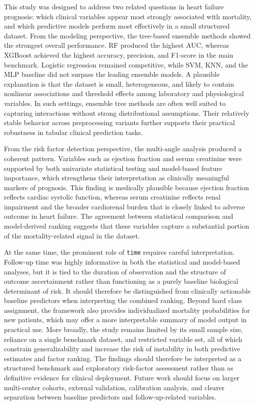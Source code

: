 This study was designed to address two related questions in heart failure prognosis: which clinical variables appear most strongly associated with mortality, and which predictive models perform most effectively in a small structured dataset. From the modeling perspective, the tree-based ensemble methods showed the strongest overall performance. RF produced the highest AUC, whereas XGBoost achieved the highest accuracy, precision, and F1-score in the main benchmark. Logistic regression remained competitive, while SVM, KNN, and the MLP baseline did not surpass the leading ensemble models. A plausible explanation is that the dataset is small, heterogeneous, and likely to contain nonlinear associations and threshold effects among laboratory and physiological variables. In such settings, ensemble tree methods are often well suited to capturing interactions without strong distributional assumptions. Their relatively stable behavior across preprocessing variants further supports their practical robustness in tabular clinical prediction tasks.

From the risk factor detection perspective, the multi-angle analysis produced a coherent pattern. Variables such as ejection fraction and serum creatinine were supported by both univariate statistical testing and model-based feature importance, which strengthens their interpretation as clinically meaningful markers of prognosis. This finding is medically plausible because ejection fraction reflects cardiac systolic function, whereas serum creatinine reflects renal impairment and the broader cardiorenal burden that is closely linked to adverse outcome in heart failure. The agreement between statistical comparison and model-derived ranking suggests that these variables capture a substantial portion of the mortality-related signal in the dataset.

At the same time, the prominent role of \texttt{time} requires careful interpretation. Follow-up time was highly informative in both the statistical and model-based analyses, but it is tied to the duration of observation and the structure of outcome ascertainment rather than functioning as a purely baseline biological determinant of risk. It should therefore be distinguished from clinically actionable baseline predictors when interpreting the combined ranking. Beyond hard class assignment, the framework also provides individualized mortality probabilities for new patients, which may offer a more interpretable summary of model output in practical use. More broadly, the study remains limited by its small sample size, reliance on a single benchmark dataset, and restricted variable set, all of which constrain generalizability and increase the risk of instability in both predictive estimates and factor ranking. The findings should therefore be interpreted as a structured benchmark and exploratory risk-factor assessment rather than as definitive evidence for clinical deployment. Future work should focus on larger multi-center cohorts, external validation, calibration analysis, and clearer separation between baseline predictors and follow-up-related variables.
